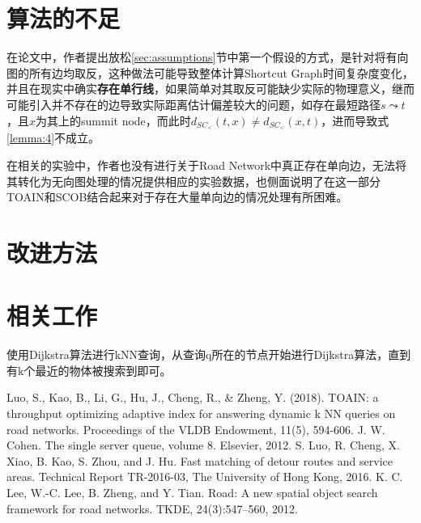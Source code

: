 \documentclass{ML}
\begin{document}
\section{算法的不足}\label{sec:shortcoming}
在论文中，作者提出放松\ref{sec:assumptions}节中第一个假设的方式，是针对将有向图的所有边均取反，这种做法可能导致整体计算Shortcut Graph时间复杂度变化，并且在现实中确实\textbf{存在单行线}，如果简单对其取反可能缺少实际的物理意义，继而可能引入并不存在的边导致实际距离估计偏差较大的问题，如存在最短路径$s \leadsto t$，且$x$为其上的summit node，而此时$d_{SC_{<}}(t, x) \neq d_{SC_{<}}(x, t)$，进而导致式\eqref{lemma:4}不成立。

在相关的实验中，作者也没有进行关于Road Network中真正存在单向边，无法将其转化为无向图处理的情况提供相应的实验数据，也侧面说明了在这一部分TOAIN和SCOB结合起来对于存在大量单向边的情况处理有所困难。
\section{改进方法}

\section{相关工作}
使用Dijkstra算法进行kNN查询，从查询q所在的节点开始进行Dijkstra算法，直到有k个最近的物体被搜索到即可。


\appendix

\begin{thebibliography}{20}
     Luo, S., Kao, B., Li, G., Hu, J., Cheng, R., \& Zheng, Y. (2018). TOAIN: a throughput optimizing adaptive index for answering dynamic k NN queries on road networks. Proceedings of the VLDB Endowment, 11(5), 594-606.
     J. W. Cohen. The single server queue, volume 8. Elsevier, 2012.
    S. Luo, R. Cheng, X. Xiao, B. Kao, S. Zhou, and J. Hu. Fast
    matching of detour routes and service areas. Technical
    Report TR-2016-03, The University of Hong Kong, 2016.
    K. C. Lee, W.-C. Lee, B. Zheng, and Y. Tian. Road: A new
    spatial object search framework for road networks. TKDE,
    24(3):547–560, 2012.
\end{thebibliography}
\end{document}
